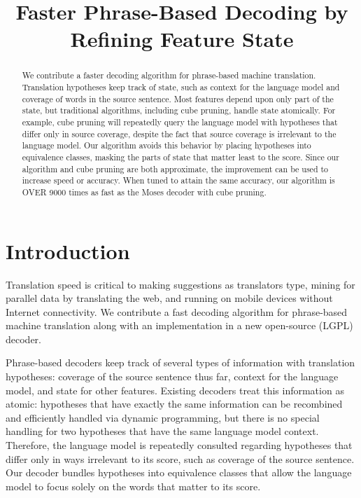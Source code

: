 \documentclass[11pt]{article}
\title{Faster Phrase-Based Decoding by Refining Feature State}
\author{}
\date{}
\begin{document}
\maketitle
\begin{abstract}
We contribute a faster decoding algorithm for phrase-based machine translation.  Translation hypotheses keep track of state, such as context for the language model and coverage of words in the source sentence.  Most features depend upon only part of the state, but traditional algorithms, including cube pruning, handle state atomically.  For example, cube pruning will repeatedly query the language model with hypotheses that differ only in source coverage, despite the fact that source coverage is irrelevant to the language model.  
Our algorithm avoids this behavior by placing hypotheses into equivalence classes, masking the parts of state that matter least to the score.  
Since our algorithm and cube pruning are both approximate, the improvement can be used to increase speed or accuracy.  
When tuned to attain the same accuracy, our algorithm is OVER 9000 times as fast as the Moses decoder with cube pruning.  
\end{abstract}

\section{Introduction}
\label{intro_label}
Translation speed is critical to making suggestions as translators type, mining for parallel data by translating the web, and running on mobile devices without Internet connectivity.  We contribute a fast decoding algorithm for phrase-based machine translation along with an implementation in a new open-source (LGPL) decoder.  

Phrase-based decoders \cite{moses,phrasal,jane-phrase} keep track of several types of information with translation hypotheses: coverage of the source sentence thus far, context for the language model, and state for other features.  Existing decoders treat this information as atomic: hypotheses that have exactly the same information can be recombined and efficiently handled via dynamic programming, but there is no special handling for two hypotheses that have the same language model context.  Therefore, the language model is repeatedly consulted regarding hypotheses that differ only in ways irrelevant to its score, such as coverage of the source sentence.  Our decoder bundles hypotheses into equivalence classes that allow the language model to focus solely on the words that matter to its score.  
\end{document}
